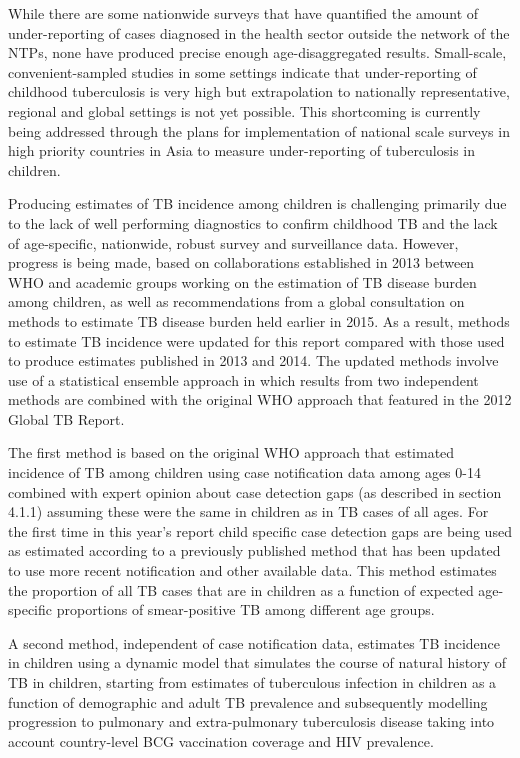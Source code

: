 While there are some nationwide surveys that have quantified the amount of under-reporting of cases diagnosed in the health sector outside the network of the NTPs\cite{20487611}\cite{17156496}\cite{18346285}, none have produced precise enough age-disaggregated results. Small-scale, convenient-sampled studies in some settings indicate that under-reporting of childhood tuberculosis is very high\cite{21985569}\cite{Coghlan2015-xn} but extrapolation to nationally representative, regional and global settings is not yet possible. This shortcoming is currently being addressed through the plans for implementation of national scale surveys in high priority countries in Asia to measure under-reporting of tuberculosis in children\cite{noauthor_2014-gv}.

Producing estimates of TB incidence among children is challenging primarily due to the lack of well performing diagnostics to confirm childhood TB and the lack of age-specific, nationwide, robust survey and surveillance data. However, progress is being made, based on collaborations established in 2013 between WHO and academic groups working on the estimation of TB disease burden among children, as well as recommendations from a global consultation on methods to estimate TB disease burden held earlier in 2015. As a result, methods to estimate TB incidence were updated for this report compared with those used to produce estimates published in 2013 and 2014. The updated methods involve use of a statistical ensemble approach in which results from two independent methods are combined with the original WHO approach that featured in the 2012 Global TB Report. 

The first method is based on the original WHO approach that estimated incidence of TB among children using case notification data among ages 0-14 combined with expert opinion about case detection gaps (as described in section 4.1.1) assuming these were the same in children as in TB cases of all ages. For the first time in this year’s report child specific case detection gaps are being used as estimated according to a previously published method\cite{Jenkins_2014} that has been updated to use more recent notification and other available data\cite{Sismanidis_2014}. This method estimates the proportion of all TB cases that are in children as a function of expected age-specific proportions of smear-positive TB among different age groups. 

A second method, independent of case notification data, estimates TB incidence in children using a dynamic model that simulates the course of natural history of TB in children, starting from estimates of tuberculous infection in children as a function of demographic and adult TB prevalence and subsequently modelling progression to pulmonary and extra-pulmonary tuberculosis disease taking into account country-level BCG vaccination coverage and HIV prevalence\cite{Dodd_2014}. 

